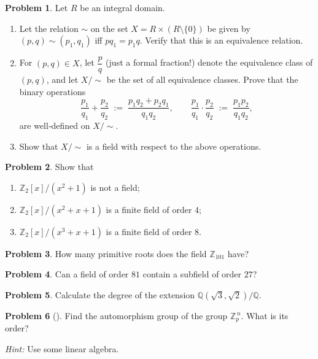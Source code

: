\documentclass[10pt]{article}
\theoremstyle{definition} %
\newtheorem{problem}{Problem}
\theoremstyle{plain} %
\begin{document}
\begin{problem}
  Let $R$ be an integral domain.
  \begin{enumerate}[label=\arabic*)]
      \item Let the relation $\sim$ on the set $X = R \times (R\setminus\{0\})$
            be given by $(p,q) \sim (p_1,q_1)$ iff $pq_1 = p_1q$.
            Verify that this is an equivalence relation.
      \item For $(p,q) \in X$, let $\dfrac{p}{q}$ (just a formal fraction!)
            denote the equivalence class of $(p,q)$, and let $X/\!\sim$
            be the set of all equivalence classes.
            Prove that the binary operations
            \[
                \frac{p_1}{q_1} + \frac{p_2}{q_2}
                \;:=\;
                \frac{p_1q_2 + p_2q_1}{q_1q_2},
                \qquad
                \frac{p_1}{q_1} \cdot \frac{p_2}{q_2}
                \;:=\;
                \frac{p_1p_2}{q_1q_2},
            \]
            are well‑defined on $X/\!\sim$.
      \item Show that $X/\!\sim$ is a field with respect to the above operations.
  \end{enumerate}
\end{problem}

\begin{problem}
  Show that
  \begin{enumerate}[label=(\alph*)]
      \item $\mathbb{Z}_2[x]/(x^{2}+1)$ is not a field;
      \item $\mathbb{Z}_2[x]/(x^{2}+x+1)$ is a finite field of order $4$;
      \item $\mathbb{Z}_2[x]/(x^{3}+x+1)$ is a finite field of order $8$.
  \end{enumerate}
\end{problem}

\begin{problem}
  How many primitive roots does the field $\mathbb{Z}_{101}$ have?
\end{problem}

\begin{problem}
  Can a field of order $81$ contain a subfield of order $27$?
\end{problem}

\begin{problem}
  Calculate the degree of the extension $\mathbb{Q}(\sqrt{3},\sqrt{2})/\mathbb{Q}$.
\end{problem}

\begin{problem}[]
  Find the automorphism group of the group $\mathbb{Z}_p^{\,n}$.
  What is its order?

  \textit{Hint:} Use some linear algebra.
\end{problem}
\end{document}
